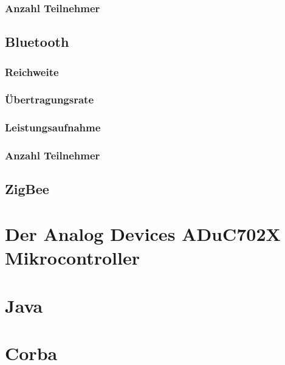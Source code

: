 \subsubsection{Anzahl Teilnehmer}

\subsection{Bluetooth}
\subsubsection{Reichweite}
\subsubsection{Übertragungsrate}
\subsubsection{Leistungsaufnahme}
\subsubsection{Anzahl Teilnehmer}

\subsection{ZigBee}

\section{Der Analog Devices ADuC702X Mikrocontroller}

\section{Java}

\section{Corba}
